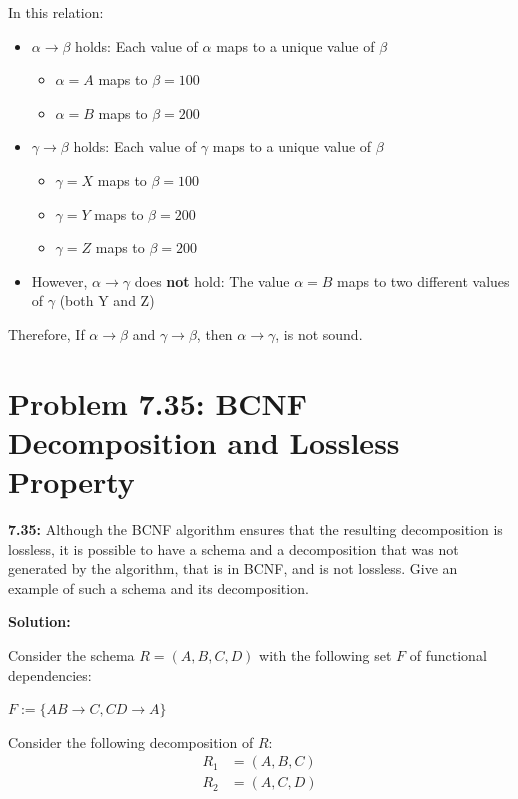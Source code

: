 \documentclass[12pt,a4paper]{article}
\begin{document}
In this relation:
\begin{itemize}
    \item $\alpha \rightarrow \beta$ holds: Each value of $\alpha$ maps to a unique value of $\beta$
    \begin{itemize}
        \item $\alpha = A$ maps to $\beta = 100$
        \item $\alpha = B$ maps to $\beta = 200$
    \end{itemize}
    
    \item $\gamma \rightarrow \beta$ holds: Each value of $\gamma$ maps to a unique value of $\beta$
    \begin{itemize}
        \item $\gamma = X$ maps to $\beta = 100$
        \item $\gamma = Y$ maps to $\beta = 200$
        \item $\gamma = Z$ maps to $\beta = 200$
    \end{itemize}
    
    \item However, $\alpha \rightarrow \gamma$ does \textbf{not} hold: The value $\alpha = B$ maps to two different values of $\gamma$ (both Y and Z)
\end{itemize}
Therefore, If $\alpha \rightarrow \beta$ and $\gamma \rightarrow \beta$, then $\alpha \rightarrow \gamma$, is not sound.
\newpage
\section{Problem 7.35: BCNF Decomposition and Lossless Property}

\begin{questionbox}
\textbf{7.35:} Although the BCNF algorithm ensures that the resulting decomposition is lossless, it is possible to have a schema and a decomposition that was not generated by the algorithm, that is in BCNF, and is not lossless. Give an example of such a schema and its decomposition.
\end{questionbox}


\textbf{Solution:}

Consider the schema $R = (A, B, C, D)$ with the following set $F$ of functional dependencies:

$F := \{AB \rightarrow C, CD \rightarrow A\}$

Consider the following decomposition of $R$:
\begin{align}
R_1 &= (A, B, C) \\
R_2 &= (A, C, D)
\end{align}
\end{document}
